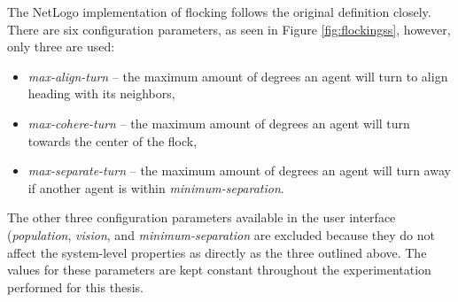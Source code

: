 The NetLogo implementation of flocking follows the original definition closely.
There are six configuration parameters, as seen in Figure \ref{fig:flockingss}, however, only three are used:
\begin{itemize}
\item \textit{max-align-turn} -- the maximum amount of degrees an agent will turn to align heading with its neighbors,
\item \textit{max-cohere-turn} -- the maximum amount of degrees an agent will turn towards the center of the flock,
\item \textit{max-separate-turn} -- the maximum amount of degrees an agent will turn away if another agent is within \textit{minimum-separation}.
\end{itemize}
The other three configuration parameters available in the user interface (\textit{population}, \textit{vision}, and \textit{minimum-separation} are excluded because they do not affect the system-level properties as directly as the three outlined above.
The values for these parameters are kept constant throughout the experimentation performed for this thesis.

